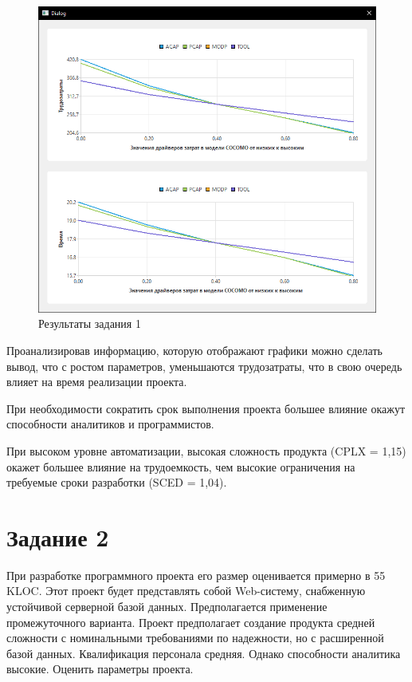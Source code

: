 \begin{figure}[!h]
	\centering
	\includegraphics[width=1\linewidth]{inc/img/3.png}
	\caption{Результаты задания 1}
	\label{p3}
\end{figure}

Проанализировав информацию, которую отображают графики можно
сделать вывод, что с ростом параметров, уменьшаются трудозатраты, что в свою
очередь влияет на время реализации проекта.

При необходимости сократить срок выполнения проекта большее влияние окажут способности аналитиков и программистов.

При высоком уровне автоматизации, высокая сложность продукта (CPLX = 1,15) окажет большее влияние на трудоемкость, чем высокие ограничения на требуемые сроки разработки (SCED = 1,04).

\section*{Задание 2}
При разработке программного проекта его размер оценивается примерно в 55 KLOC. Этот проект будет представлять собой Web-систему, снабженную устойчивой серверной базой данных. Предполагается применение промежуточного варианта. Проект предполагает создание продукта средней сложности с номинальными требованиями по надежности, но с расширенной базой данных. Квалификация персонала средняя. Однако способности аналитика высокие. Оценить параметры проекта.

